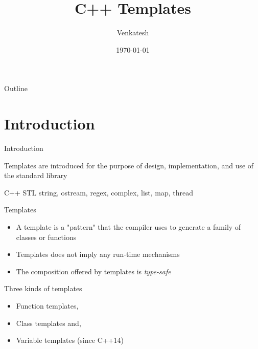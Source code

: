 \documentclass{beamer}
\title{C++ Templates} %
\author{Venkatesh} %
\institute{WDC}
\date{\today} %
\begin{document}
\lstset{breakatwhitespace=true,
language=C++,
columns=fullflexible,
keepspaces=true,
breaklines=true,
tabsize=3, 
showstringspaces=false,
extendedchars=true
inputencoding=utf8}


\begin{frame}
\titlepage %
\end{frame}

\begin{frame}{Outline}
  \tableofcontents
\end{frame}



\section{Introduction}
\begin{frame}{Introduction}

Templates are introduced for the purpose of design,
implementation, and use of the standard library

\begin{block}{C++ STL}
string, ostream, regex, complex, list, map, thread
\end{block}
\end{frame}

\begin{frame}{Templates}

\begin{itemize}
\item A template is a "pattern" that the compiler uses to generate a family of classes or functions
\item Templates does not imply any run-time mechanisms
\item The composition offered by templates is \textit{type-safe}
\end{itemize}

\begin{block}{Three kinds of templates}
\begin{itemize}
\item Function templates,
\item Class templates and,
\item Variable templates (since C++14)
\end{itemize}
\end{block}
\end{frame}
\end{document}
